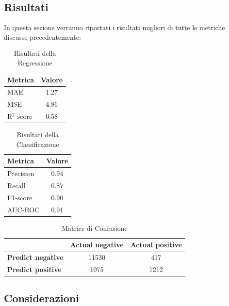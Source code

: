 \documentclass[italian,12pt,a4paper]{article}
\begin{document}
		\subsection{Risultati}
			In questa sezione verranno riportati i risultati migliori di tutte le metriche discusse precedentemente:\\
	
				\begin{table}[h]
					\centering
					\begin{tabular}{|l|c|}
						\hline
						\textbf{Metrica} & \textbf{Valore} \\
						\hline
						MAE & 1.27 \\
						\hline
						MSE & 4.86 \\
						\hline
						R$^2$ score & 0.58 \\
						\hline
					\end{tabular}
					\caption{Risultati della Regressione}
				\end{table}
			
				\begin{table}[h]
					\centering
					\begin{tabular}{|l|c|}
						\hline
						\textbf{Metrica} & \textbf{Valore} \\
						\hline
						Precision & 0.94 \\
						\hline
						Recall & 0.87 \\
						\hline
						F1-score & 0.90 \\
						\hline
						AUC-ROC & 0.91 \\
						\hline
					\end{tabular}
					\caption{Risultati della Classificazione}
			\end{table}
					
			\begin{table}[h]
				\centering
				\begin{tabular}{|l|c|c|}
					\hline
					& \textbf{Actual negative} & \textbf{Actual positive} \\
					\hline
					\textbf{Predict negative} & 11530 & 417 \\
					\hline
					\textbf{Predict positive} & 1075 & 7212 \\
					\hline
				\end{tabular}
				\caption{Matrice di Confusione}
			\end{table}

		\subsection{Considerazioni}
\end{document}
